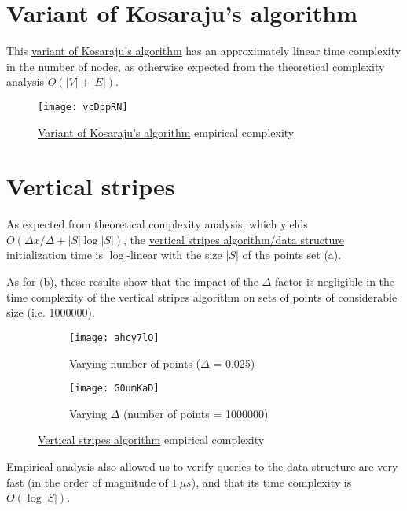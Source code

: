 \section{Variant of Kosaraju's algorithm}
This \hyperref[algorithm-scc-kosaraju-v]{variant of Kosaraju's algorithm} has an approximately linear time complexity in the number of nodes, as otherwise expected from the theoretical complexity analysis $O(|V|+|E|)$.

\begin{figure}[H]
    \centering
    \texttt{[image: vcDppRN]}
    \caption{\hyperref[algorithm-scc-kosaraju-v]{Variant of Kosaraju's algorithm} empirical complexity}
\end{figure}

\section{Vertical stripes}

As expected from theoretical complexity analysis, which yields $O(\Delta x / \Delta + |S| \log |S|)$, the \hyperref[algorithm-vstripes]{vertical stripes algorithm/data structure} initialization time is $\log$-linear with the size $|S|$ of the points set (a).\par
As for (b), these results show that the impact of the $\Delta$ factor is negligible in the time complexity of the vertical stripes algorithm on sets of points of considerable size (i.e. 1000000).

\begin{figure}[H]
    \centering
    \begin{subfigure}{0.49\textwidth}
        \centering
        \texttt{[image: ahcy7lO]}
        \caption{Varying number of points ($\Delta$ = 0.025)}
    \end{subfigure}
    \begin{subfigure}{0.49\textwidth}
        \centering
        \texttt{[image: G0umKaD]}
        \caption{Varying $\Delta$ (number of points = 1000000)}
    \end{subfigure}
    \caption{\hyperref[algorithm-vstripes]{Vertical stripes algorithm} empirical complexity}
\end{figure}
\pagebreak
Empirical analysis also allowed us to verify queries to the data structure are very fast (in the order of magnitude of $\SI{1}{\mu s}$), and that its time complexity is $O(\log |S|)$.


